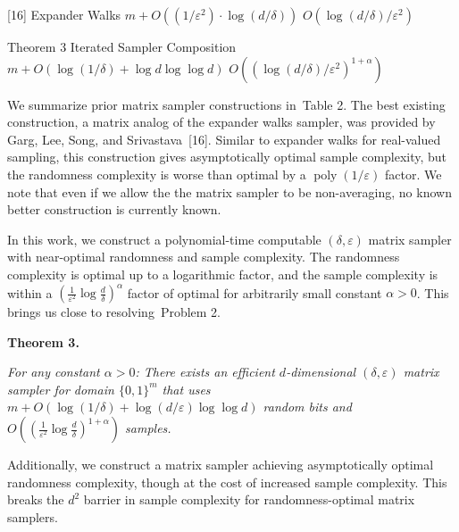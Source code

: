 [16] 
Expander Walks 
$m+O((1/\varepsilon^{2})\cdot\log(d/\delta))$ 
$O(\log(d/\delta)/\varepsilon^{2})$ 
\par


Theorem 3 
Iterated Sampler Composition 
$m+O(\log(1/\delta)+\log d\log\log d)$ 
$O((\log(d/\delta)/\varepsilon^{2})^{1+\alpha})$ 
\par







We summarize prior matrix sampler constructions in Table 2.
The best existing construction, a matrix analog of the expander walks sampler, was provided by Garg, Lee, Song, and Srivastava [16].
Similar to expander walks for real-valued sampling, this construction gives asymptotically optimal sample complexity, but the randomness complexity is worse than optimal by a $\operatorname*{poly}(1/\varepsilon)$ factor. We note that even if we allow the the matrix sampler to be non-averaging, no known better construction is currently known.\par




In this work, we construct a polynomial-time computable $(\delta,\varepsilon)$ matrix sampler with near-optimal randomness and sample complexity. The randomness complexity is optimal up to a logarithmic factor, and the sample complexity is within a $(\frac{1}{\varepsilon^{2}}\log\frac{d}{\delta})^{\alpha}$ factor of optimal for arbitrarily small constant $\alpha>0$. This brings us close to resolving Problem 2.\par





\par\medskip\noindent\textbf{
\textbf{Theorem 3}\textbf{.}
}\par



\emph{For any constant $\alpha>0$:
There exists an efficient $d$-dimensional $(\delta,\varepsilon)$ matrix sampler for domain $\{0,1\}^{m}$ that uses $m+O(\log(1/\delta)+\log(d/\varepsilon)\log\log d)$ random bits and $O((\frac{1}{\varepsilon^{2}}\log\frac{d}{\delta})^{1+\alpha})$ samples.}\par






Additionally, we construct a matrix sampler achieving asymptotically optimal randomness complexity, though at the cost of increased sample complexity. This breaks the $d^{2}$ barrier in sample complexity for randomness-optimal matrix samplers.\par



